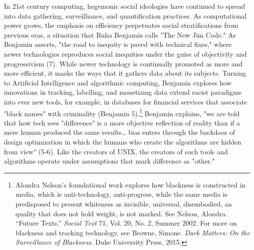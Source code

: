 \documentclass[11pt]{article}
\begin{document}
In 21st century computing, hegemonic social ideologies have continued
to spread into data gathering, surveilliance, and quantification
practices. As computational power grows, the emphasis on efficiency
perpetuates social stratifications from previous eras, a situation
that Ruha Benjamin calls "The New Jim Code." As Benjamin asserts, "the
road to inequity is paved with technical fixes," where newer
technologies reproduces social inequities under the guise of
objectivity and progressivism (7). While newer technology is
continually promoted as more and more efficient, it masks the ways
that it gathers data about its subjects. Turning to Artificial
Intelligence and algorithmic computing, Benjamin explores how
innovations in tracking, labelling, and monetizing data extend racist
paradigms into ever new tools, for example, in databases for financial
services that associate "black names" with criminality (Benjamin
5).\footnote{Alondra Nelson's foundational work explores how blackness is
constructed in media, which is anti-technology, anti-progress, while
the same media is predisposed to present whiteness as invisible,
universal, disembodied, an quality that does not hold weight, is not
marked. See Nelson, Alondra. “Future Texts.” \emph{Social Text} 71, Vol. 20,
No. 2, Summer 2002. For more on blackness and tracking technology, see
Browne, Simone. \emph{Dark Matters: On the Surveillance of Blackness}. Duke
University Press, 2015.} Benjamin explains, "we are told that how tech sees
"difference" is a more objective reflection of reality than if a mere
human produced the same results\ldots{} bias enters through the backdoor of
design optimization in which the humans who create the algorithms are
hidden from view" (5-6). Like the creators of UNIX, the creators of
such tools and algorithms operate under assumptions that mark
difference as "other."
\end{document}
